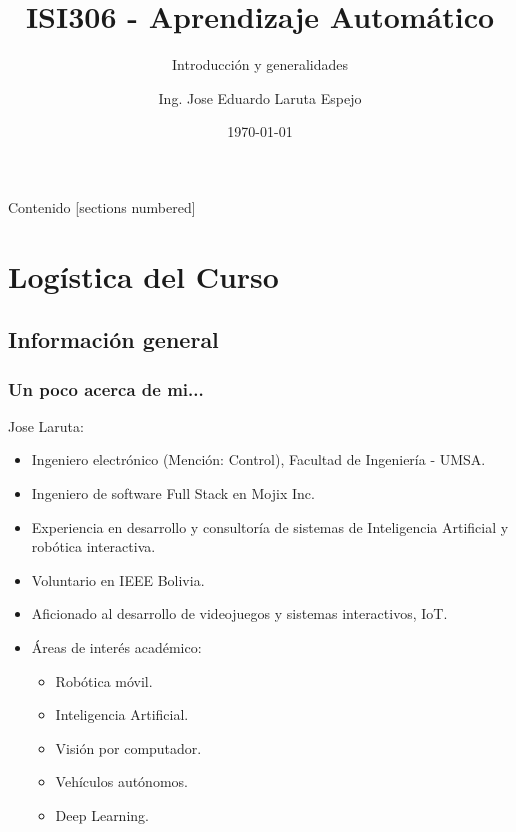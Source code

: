 \documentclass[10pt]{beamer}
\title{ISI306 - Aprendizaje Automático}
\subtitle{Introducción y generalidades}
\date{\today}
\author{Ing. Jose Eduardo Laruta Espejo}
\institute{Universidad La Salle - Bolivia}
\begin{document}
\maketitle

\begin{frame}[allowframebreaks]{Contenido}
  [sections numbered]
  \tableofcontents[]
\end{frame}




\section{Logística del Curso}
\subsection{Información general}
\begin{frame}
    \frametitle{Un poco acerca de mi...}
    Jose Laruta:
    \begin{itemize}
        \item Ingeniero electrónico (Mención: Control), Facultad de Ingeniería - UMSA. 
        \item Ingeniero de software Full Stack en Mojix Inc.
        \item Experiencia en desarrollo y consultoría de sistemas de Inteligencia Artificial y robótica interactiva.
        \item Voluntario en IEEE Bolivia.
        \item Aficionado al desarrollo de videojuegos y sistemas interactivos, IoT.
        \item Áreas de interés académico:
            \begin{itemize}
                \item Robótica móvil.
                \item Inteligencia Artificial.
                \item Visión por computador.
                \item Vehículos autónomos.
                \item Deep Learning.
            \end{itemize}
    \end{itemize}
\end{frame}
\end{document}
